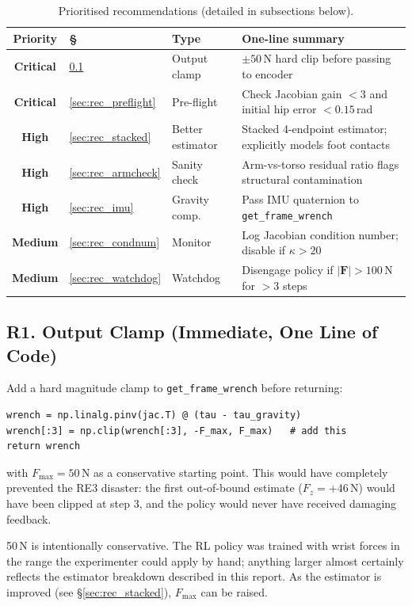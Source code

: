 \documentclass[11pt,a4paper]{article}
\begin{document}
\begin{table}[H]
\centering
\caption{Prioritised recommendations (detailed in subsections below).}
\label{tab:recs_summary}
\begin{tabular}{clll}
\toprule
Priority & \S & Type & One-line summary \\
\midrule
\textbf{Critical} & \ref{sec:rec_clamp}   & Output clamp & $\pm 50$\,N hard clip before passing to encoder \\
\textbf{Critical} & \ref{sec:rec_preflight} & Pre-flight & Check Jacobian gain $<3$ and initial hip error $<0.15$\,rad \\
\textbf{High}     & \ref{sec:rec_stacked}  & Better estimator & Stacked 4-endpoint estimator; explicitly models foot contacts \\
\textbf{High}     & \ref{sec:rec_armcheck} & Sanity check & Arm-vs-torso residual ratio flags structural contamination \\
\textbf{High}     & \ref{sec:rec_imu}      & Gravity comp. & Pass IMU quaternion to \texttt{get\_frame\_wrench} \\
\textbf{Medium}   & \ref{sec:rec_condnum}  & Monitor & Log Jacobian condition number; disable if $\kappa>20$ \\
\textbf{Medium}   & \ref{sec:rec_watchdog} & Watchdog & Disengage policy if $|\bm{F}|>100$\,N for $>3$ steps \\
\bottomrule
\end{tabular}
\end{table}

\subsection{R1. Output Clamp (Immediate, One Line of Code)}
\label{sec:rec_clamp}

Add a hard magnitude clamp to \texttt{get\_frame\_wrench} before returning:
\begin{lstlisting}
wrench = np.linalg.pinv(jac.T) @ (tau - tau_gravity)
wrench[:3] = np.clip(wrench[:3], -F_max, F_max)   # add this
return wrench
\end{lstlisting}
with $F_\text{max} = 50$\,N as a conservative starting point.  This would
have completely prevented the RE3 disaster: the first out-of-bound estimate
($F_z = +46$\,N) would have been clipped at step 3, and the policy would
never have received damaging feedback.

50\,N is intentionally conservative.  The RL policy was trained with wrist
forces in the range the experimenter could apply by hand; anything larger
almost certainly reflects the estimator breakdown described in this report.
As the estimator is improved (see \S\ref{sec:rec_stacked}), $F_\text{max}$
can be raised.
\end{document}
